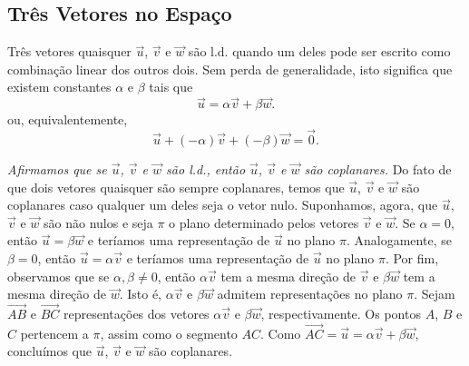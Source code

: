 
\subsection{Três Vetores no Espaço}

Três vetores quaisquer $\vec{u}$, $\vec{v}$ e $\vec{w}$ são l.d. quando um deles pode ser escrito como combinação linear dos outros dois. Sem perda de generalidade, isto significa que existem constantes $\alpha$ e $\beta$ tais que
\begin{equation}
  \vec{u} = \alpha\vec{v} + \beta\vec{w}.
\end{equation}
ou, equivalentemente,
\begin{equation}
  \vec{u} + (-\alpha)\vec{v} + (-\beta)\vec{w} = \vec{0}.
\end{equation}

\emph{Afirmamos que se $\vec{u}$, $\vec{v}$ e $\vec{w}$ são l.d., então $\vec{u}$, $\vec{v}$ e $\vec{w}$ são coplanares.} Do fato de que dois vetores quaisquer são sempre coplanares, temos que $\vec{u}$, $\vec{v}$ e $\vec{w}$ são coplanares caso qualquer um deles seja o vetor nulo. Suponhamos, agora, que $\vec{u}$, $\vec{v}$ e $\vec{w}$ são não nulos e seja $\pi$ o plano determinado pelos vetores $\vec{v}$ e $\vec{w}$. Se $\alpha = 0$, então $\vec{u} = \beta\vec{w}$ e teríamos uma representação de $\vec{u}$ no plano $\pi$. Analogamente, se $\beta=0$, então $\vec{u} = \alpha\vec{v}$ e teríamos uma representação de $\vec{u}$ no plano $\pi$. Por fim, observamos que se $\alpha,\beta\neq 0$, então $\alpha\vec{v}$ tem a mesma direção de $\vec{v}$ e $\beta\vec{w}$ tem a mesma direção de $\vec{w}$. Isto é, $\alpha\vec{v}$ e $\beta\vec{w}$ admitem representações no plano $\pi$. Sejam $\overrightarrow{AB}$ e $\overrightarrow{BC}$ representações dos vetores $\alpha\vec{v}$ e $\beta\vec{w}$, respectivamente. Os pontos $A$, $B$ e $C$ pertencem a $\pi$, assim como o segmento $AC$. Como $\overrightarrow{AC} = \vec{u} = \alpha\vec{v} + \beta\vec{w}$, concluímos que $\vec{u}$, $\vec{v}$ e $\vec{w}$ são coplanares.


